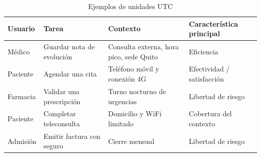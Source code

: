 \begin{table}[H]
\centering
\caption{Ejemplos de unidades UTC}
\begin{tabularx}{\textwidth}{p{2.2cm}p{3.5cm}Yp{3cm}}
\toprule
Usuario & Tarea & Contexto & Característica principal \\
\midrule
Médico & Guardar nota de evolución & Consulta externa, hora pico, sede Quito & Eficiencia \\
Paciente & Agendar una cita & Teléfono móvil y conexión 4G & Efectividad / satisfacción \\
Farmacia & Validar una prescripción & Turno nocturno de urgencias & Libertad de riesgo \\
Paciente & Completar teleconsulta & Domicilio y WiFi limitado & Cobertura del contexto \\
Admisión & Emitir factura con seguro & Cierre mensual & Libertad de riesgo \\
\bottomrule
\end{tabularx}
\end{table}
